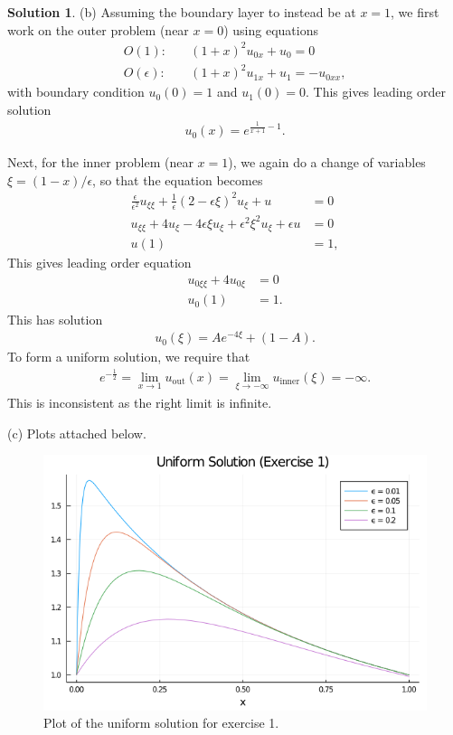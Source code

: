 \documentclass[12pt]{article}
\theoremstyle{definition}
\newtheorem{sol}{Solution}
\theoremstyle{remark}
\begin{document}
\begin{sol}
(b) Assuming the boundary layer to instead be at $x = 1$, we first work on the outer problem (near $x = 0$) using equations
\begin{align*}
    O(1): &\quad (1 + x)^{2} u_{0x} + u_{0} = 0\\
    O(\epsilon): &\quad (1 + x)^{2} u_{1x} + u_{1} = -u_{0xx},
\end{align*}
with boundary condition $u_{0}(0) = 1$ and $u_{1}(0) = 0$. This gives leading order solution
\begin{align*}
    u_{0}(x) = e^{\frac{1}{x+1} - 1}.
\end{align*}

Next, for the inner problem (near $x = 1$), we again do a change of variables $\xi = (1-x) / \epsilon$, so that the equation becomes
 \begin{align*}
     \frac{\epsilon}{\epsilon^{2}} u_{\xi \xi} + \frac{1}{\epsilon} (2 - \epsilon\xi)^{2}  u_{\xi} + u &= 0\\
     u_{\xi \xi} + 4 u_{\xi}  - 4 \epsilon\xi u_{\xi} + \epsilon^{2}\xi^{2} u_{\xi} + \epsilon u &= 0\\
     u(1) &= 1,
\end{align*}
This gives leading order equation
\begin{align*}
    u_{0\xi \xi} + 4 u_{0\xi} &= 0\\
    u_{0}(1) &= 1.
\end{align*}
This has solution
\begin{align*}
    u_{0}(\xi) = A e^{- 4\xi} + (1 - A).
\end{align*}
To form a uniform solution, we require that
\begin{align*}
    e^{-\frac{1}{2}} = \lim_{x \to 1} u_{\text{out}}(x) = \lim_{\xi \to -\infty} u_{\text{inner}}(\xi) = - \infty.
\end{align*}
This is inconsistent as the right limit is infinite.

(c) Plots attached below.

\newpage

\begin{figure}[h]
    \centering
    \includegraphics[width=0.8\linewidth]{figs/hw-5-exer-1.png}
    \caption{Plot of the uniform solution for exercise 1.}%
    \label{fig:figs/hw-5-exer-1}
\end{figure}


\end{sol}
\end{document}
